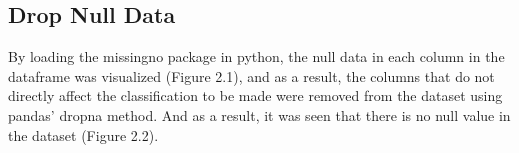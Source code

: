 \documentclass[onecolumn]{article}
\begin{document}
\subsection{Drop Null Data}
By loading the missingno package in python, the null data in each column in the dataframe was visualized (Figure 2.1), and as a result, the columns that do not directly affect the classification to be made were removed from the dataset using pandas’ dropna method. And as a result, it was seen that there is no null value in the dataset (Figure 2.2).
\begin{figure}[h!t]
\centering
{}
\caption{\label{fig:demo}
}
\end{figure}
\end{document}
